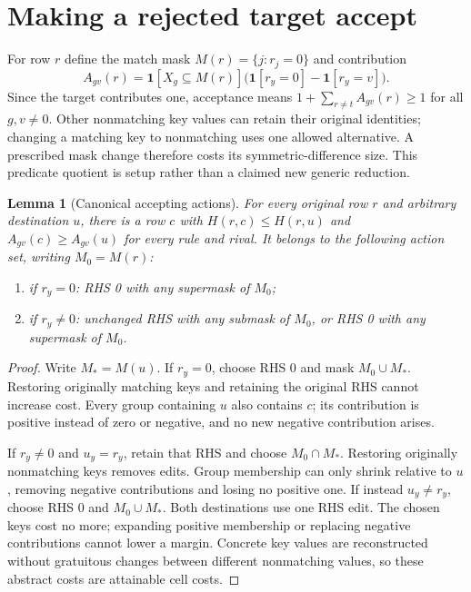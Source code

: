 \documentclass[11pt]{article}
\newtheorem{lemma}{Lemma}
\newcommand{\ind}{\mathbf{1}}
\begin{document}
\section{Making a rejected target accept}
For row $r$ define the match mask $M(r)=\{j:r_j=0\}$ and contribution
\[
 A_{gv}(r)=\ind[X_g\subseteq M(r)]
           \bigl(\ind[r_y=0]-\ind[r_y=v]\bigr).
\]
Since the target contributes one, acceptance means
$1+\sum_{r\ne t}A_{gv}(r)\geq1$ for all $g,v\ne0$.
Other nonmatching key values can retain their original identities; changing a
matching key to nonmatching uses one allowed alternative. A prescribed mask
change therefore costs its symmetric-difference size. This predicate quotient
is setup rather than a claimed new generic reduction.

\begin{lemma}[Canonical accepting actions]\label{lem:dominance}
For every original row $r$ and arbitrary destination $u$, there is a row $c$
with $H(r,c)\leq H(r,u)$ and $A_{gv}(c)\geq A_{gv}(u)$ for every rule and rival.
It belongs to the following action set, writing $M_0=M(r)$:
\begin{enumerate}
\item if $r_y=0$: RHS 0 with any supermask of $M_0$;
\item if $r_y\ne0$: unchanged RHS with any submask of $M_0$, or RHS 0 with any
supermask of $M_0$.
\end{enumerate}
\end{lemma}
\begin{proof}
Write $M_*=M(u)$. If $r_y=0$, choose RHS 0 and mask $M_0\cup M_*$.
Restoring originally matching keys and retaining the original RHS cannot
increase cost. Every group containing $u$ also contains $c$; its contribution
is positive instead of zero or negative, and no new negative contribution arises.

If $r_y\ne0$ and $u_y=r_y$, retain that RHS and choose $M_0\cap M_*$.
Restoring originally nonmatching keys removes edits. Group membership can only
shrink relative to $u$, removing negative contributions and losing no positive
one. If instead $u_y\ne r_y$, choose RHS 0 and $M_0\cup M_*$.
Both destinations use one RHS edit. The chosen keys cost no more; expanding
positive membership or replacing negative contributions cannot lower a margin.
Concrete key values are reconstructed without gratuitous changes between
different nonmatching values, so these abstract costs are attainable cell costs.
\end{proof}
\end{document}

